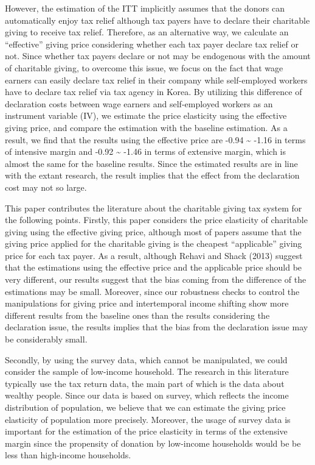 \documentclass[
  11pt,
  a4paper,
]{article}
\begin{document}
However, the estimation of the ITT implicitly assumes that the donors can automatically enjoy tax relief although tax payers have to declare their charitable giving to receive tax relief. Therefore, as an alternative way, we calculate an ``effective'' giving price considering whether each tax payer declare tax relief or not. Since whether tax payers declare or not may be endogenous with the amount of charitable giving, to overcome this issue, we focus on the fact that wage earners can easily declare tax relief in their company while self-employed workers have to declare tax relief via tax agency in Korea. By utilizing this difference of declaration costs between wage earners and self-employed workers as an instrument variable (IV), we estimate the price elasticity using the effective giving price, and compare the estimation with the baseline estimation. As a result, we find that the results using the effective price are -0.94 \textasciitilde{} -1.16 in terms of intensive margin and -0.92 \textasciitilde{} -1.46 in terms of extensive margin, which is almost the same for the baseline results. Since the estimated results are in line with the extant research, the result implies that the effect from the declaration cost may not so large.

This paper contributes the literature about the charitable giving tax system for the following points. Firstly, this paper considers the price elasticity of charitable giving using the effective giving price, although most of papers assume that the giving price applied for the charitable giving is the cheapest ``applicable'' giving price for each tax payer. As a result, although Rehavi and Shack (2013) suggest that the estimations using the effective price and the applicable price should be very different, our results suggest that the bias coming from the difference of the estimations may be small. Moreover, since our robustness checks to control the manipulations for giving price and intertemporal income shifting show more different results from the baseline ones than the results considering the declaration issue, the results implies that the bias from the declaration issue may be considerably small.

Secondly, by using the survey data, which cannot be manipulated, we could consider the sample of low-income household. The research in this literature typically use the tax return data, the main part of which is the data about wealthy people. Since our data is based on survey, which reflects the income distribution of population, we believe that we can estimate the giving price elasticity of population more precisely. Moreover, the usage of survey data is important for the estimation of the price elasticity in terms of the extensive margin since the propensity of donation by low-income households would be be less than high-income households.
\end{document}
